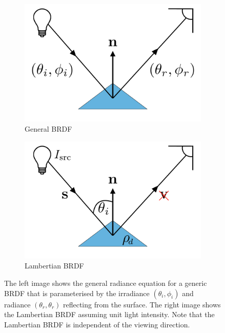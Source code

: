 \begin{figure}[t]
	\centering
	\begin{subfigure}[b]{0.45\textwidth}
		\centering
		\includegraphics[width=\textwidth]{background/images/general_brdf}
		\caption*{General BRDF}
	\end{subfigure}
	\begin{subfigure}[b]{0.45\textwidth}
		\centering
		\includegraphics[width=\textwidth]{background/images/lambertian_brdf}
		\caption*{Lambertian BRDF}
	\end{subfigure}
	\caption{The left image shows the general radiance equation for a generic
	         BRDF that is parameterised by the irradiance $(\theta_i, \phi_i)$
	         and radiance $(\theta_r, \theta_r)$ reflecting from the surface.
	         The right image shows the Lambertian BRDF assuming unit light
	         intensity. Note that the Lambertian BRDF is independent of
	         the viewing direction.}
\label{fig:bg_sfs_brdf_example}
\end{figure}

